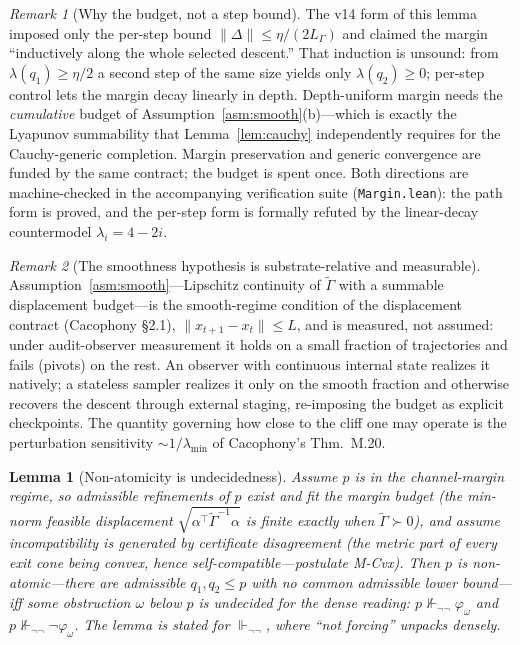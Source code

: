 \documentclass[11pt]{article}
\newtheorem{lemma}{Lemma}
\theoremstyle{definition}
\theoremstyle{remark}
\newtheorem*{remark}{Remark}
\newcommand{\forcesnn}{\Vdash_{\neg\neg}}
\newcommand{\nforcesnn}{\nVdash_{\neg\neg}}
\newcommand{\refines}{\leq}
\newcommand{\Gam}{\tilde{\Gamma}}
\newcommand{\lmin}{\lambda_{\min}}
\begin{document}
\begin{remark}[Why the budget, not a step bound]
The v14 form of this lemma imposed only the per-step bound $\|\Delta\|\le\eta/(2L_\Gamma)$ and
claimed the margin ``inductively along the whole selected descent.'' That induction is unsound: from
$\lambda(q_1)\ge\eta/2$ a second step of the same size yields only $\lambda(q_2)\ge0$; per-step
control lets the margin decay linearly in depth. Depth-uniform margin needs the \emph{cumulative}
budget of Assumption~\ref{asm:smooth}(b)---which is exactly the Lyapunov summability that
Lemma~\ref{lem:cauchy} independently requires for the Cauchy-generic completion. Margin preservation
and generic convergence are funded by the same contract; the budget is spent once. Both directions
are machine-checked in the accompanying verification suite (\texttt{Margin.lean}): the path form is
proved, and the per-step form is formally refuted by the linear-decay countermodel
$\lambda_i=4-2i$.
\end{remark}

\begin{remark}[The smoothness hypothesis is substrate-relative and measurable]
Assumption~\ref{asm:smooth}---Lipschitz continuity of $\Gam$ with a summable displacement
budget---is the smooth-regime condition of the displacement contract (Cacophony \S2.1),
$\|x_{t+1}-x_t\|\le L$, and is measured, not assumed: under audit-observer measurement it holds on a
small fraction of trajectories and fails (pivots) on the rest. An observer with continuous internal
state realizes it natively; a stateless sampler realizes it only on the smooth fraction and
otherwise recovers the descent through external staging, re-imposing the budget as explicit
checkpoints. The quantity governing how close to the cliff one may operate is the perturbation
sensitivity $\sim 1/\lmin$ of Cacophony's Thm.~M.20.
\end{remark}

\begin{lemma}[Non-atomicity is undecidedness]\label{lem:nonatom}
Assume $p$ is in the channel-margin regime, so admissible refinements of $p$ exist and fit the
margin budget (the min-norm feasible displacement $\sqrt{\alpha^{\top}\Gam^{-1}\alpha}$ is finite
exactly when $\Gam\succ0$), and assume incompatibility is generated by certificate disagreement (the
metric part of every exit cone being convex, hence self-compatible---postulate M-Cvx). Then $p$ is
\emph{non-atomic}---there are admissible $q_1,q_2\refines p$ with no common admissible lower
bound---iff some obstruction $\omega$ below $p$ is \emph{undecided for the dense reading}:
$p\nforcesnn\varphi_\omega$ and $p\nforcesnn\neg\varphi_\omega$. The lemma is stated for
$\forcesnn$, where ``not forcing'' unpacks densely.
\end{lemma}
\end{document}

